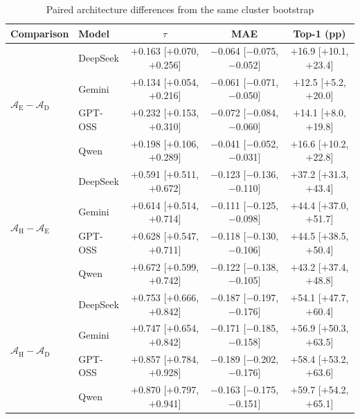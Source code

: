 \documentclass[11pt]{article}
\begin{document}
\begin{table}[htbp]
\centering
\footnotesize
\centering
\setlength{\tabcolsep}{4pt}
\renewcommand{\arraystretch}{1.10}
\caption{Paired architecture differences from the same cluster bootstrap}
\label{tab:bootstrap_paired}
\begin{tabular}{@{}l l ccc@{}}
\toprule
Comparison & Model & $\tau$ & MAE & Top-1 (pp) \\
\midrule
\multirow{4}{*}{$\mathcal{A}_{\text{E}} - \mathcal{A}_{\text{D}}$}
 & DeepSeek & $+$0.163 [$+$0.070, $+$0.256] & $-$0.064 [$-$0.075, $-$0.052] & $+$16.9 [$+$10.1, $+$23.4] \\
 & Gemini & $+$0.134 [$+$0.054, $+$0.216] & $-$0.061 [$-$0.071, $-$0.050] & $+$12.5 [$+$5.2, $+$20.0] \\
 & GPT-OSS & $+$0.232 [$+$0.153, $+$0.310] & $-$0.072 [$-$0.084, $-$0.060] & $+$14.1 [$+$8.0, $+$19.8] \\
 & Qwen & $+$0.198 [$+$0.106, $+$0.289] & $-$0.041 [$-$0.052, $-$0.031] & $+$16.6 [$+$10.2, $+$22.8] \\
\midrule
\multirow{4}{*}{$\mathcal{A}_{\text{H}} - \mathcal{A}_{\text{E}}$}
 & DeepSeek & $+$0.591 [$+$0.511, $+$0.672] & $-$0.123 [$-$0.136, $-$0.110] & $+$37.2 [$+$31.3, $+$43.4] \\
 & Gemini & $+$0.614 [$+$0.514, $+$0.714] & $-$0.111 [$-$0.125, $-$0.098] & $+$44.4 [$+$37.0, $+$51.7] \\
 & GPT-OSS & $+$0.628 [$+$0.547, $+$0.711] & $-$0.118 [$-$0.130, $-$0.106] & $+$44.5 [$+$38.5, $+$50.4] \\
 & Qwen & $+$0.672 [$+$0.599, $+$0.742] & $-$0.122 [$-$0.138, $-$0.105] & $+$43.2 [$+$37.4, $+$48.8] \\
\midrule
\multirow{4}{*}{$\mathcal{A}_{\text{H}} - \mathcal{A}_{\text{D}}$}
 & DeepSeek & $+$0.753 [$+$0.666, $+$0.842] & $-$0.187 [$-$0.197, $-$0.176] & $+$54.1 [$+$47.7, $+$60.4] \\
 & Gemini & $+$0.747 [$+$0.654, $+$0.842] & $-$0.171 [$-$0.185, $-$0.158] & $+$56.9 [$+$50.3, $+$63.5] \\
 & GPT-OSS & $+$0.857 [$+$0.784, $+$0.928] & $-$0.189 [$-$0.202, $-$0.176] & $+$58.4 [$+$53.2, $+$63.6] \\
 & Qwen & $+$0.870 [$+$0.797, $+$0.941] & $-$0.163 [$-$0.175, $-$0.151] & $+$59.7 [$+$54.2, $+$65.1] \\
\bottomrule
\end{tabular}
\renewcommand{\arraystretch}{1.0}
\end{table}
\end{document}
